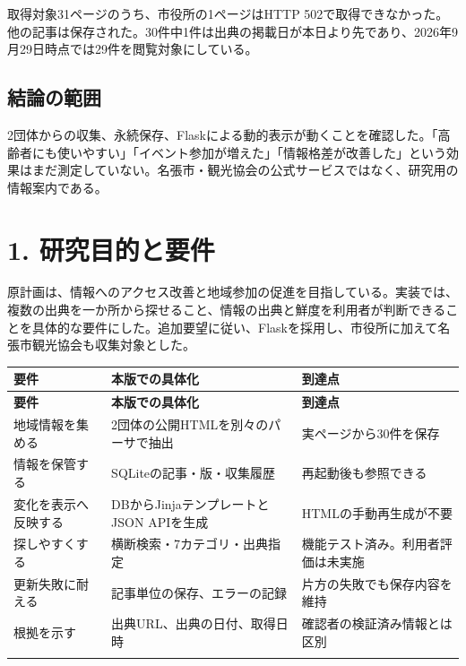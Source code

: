 \documentclass[a4paper,10pt]{ltjsarticle}
\begin{document}
取得対象31ページのうち、市役所の1ページはHTTP 502で取得できなかった。他の記事は保存された。30件中1件は出典の掲載日が本日より先であり、2026年9月29日時点では29件を閲覧対象にしている。


\subsection*{結論の範囲}

2団体からの収集、永続保存、Flaskによる動的表示が動くことを確認した。「高齢者にも使いやすい」「イベント参加が増えた」「情報格差が改善した」という効果はまだ測定していない。名張市・観光協会の公式サービスではなく、研究用の情報案内である。


\clearpage

\section*{1. 研究目的と要件}

原計画は、情報へのアクセス改善と地域参加の促進を目指している。実装では、複数の出典を一か所から探せること、情報の出典と鮮度を利用者が判断できることを具体的な要件にした。追加要望に従い、Flaskを採用し、市役所に加えて名張市観光協会も収集対象とした。


{\small\begin{longtable}{@{}>{\raggedright\arraybackslash}p{}>{\raggedright\arraybackslash}p{}>{\raggedright\arraybackslash}p{}@{}}

\rowcolor{Pale}\textbf{要件} & \textbf{本版での具体化} & \textbf{到達点} \\ \midrule

\endfirsthead

\rowcolor{Pale}\textbf{要件} & \textbf{本版での具体化} & \textbf{到達点} \\ \midrule\endhead

地域情報を集める & 2団体の公開HTMLを別々のパーサで抽出 & 実ページから30件を保存 \\ \addlinespace[3pt]

情報を保管する & SQLiteの記事・版・収集履歴 & 再起動後も参照できる \\ \addlinespace[3pt]

変化を表示へ反映する & DBからJinjaテンプレートとJSON APIを生成 & HTMLの手動再生成が不要 \\ \addlinespace[3pt]

探しやすくする & 横断検索・7カテゴリ・出典指定 & 機能テスト済み。利用者評価は未実施 \\ \addlinespace[3pt]

更新失敗に耐える & 記事単位の保存、エラーの記録 & 片方の失敗でも保存内容を維持 \\ \addlinespace[3pt]

根拠を示す & 出典URL、出典の日付、取得日時 & 確認者の検証済み情報とは区別 \\ \addlinespace[3pt]

\bottomrule\end{longtable}}
\end{document}
